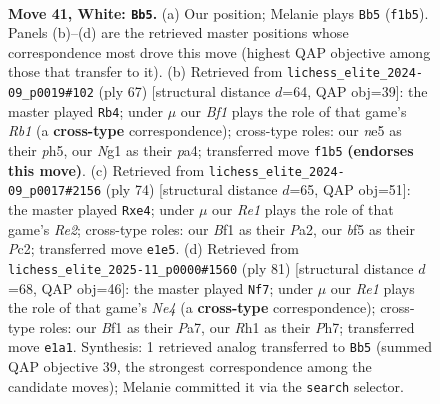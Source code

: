 \documentclass[11pt]{article}
\begin{document}
\clearpage

\begin{figure}[p]\centering
\begin{subfigure}{0.46\textwidth}\centering
\resizebox{\linewidth}{!}{%
\newchessgame
\chessboard[
  setfen={1r6/4r1k1/1p6/p1p1nb2/P5p1/1NP3P1/K6P/4RBNR w - - 3 41},
  showmover=false,
  pgfstyle=straightmove, color=movearrow, markmove={f1-b5}
]}
\caption{}
\end{subfigure}\hfill
\begin{subfigure}{0.46\textwidth}\centering
\resizebox{\linewidth}{!}{%
\newchessgame
\chessboard[
  setfen={1r5r/5kp1/4p3/p2pP2P/P1nP1P2/7R/8/R1B2K2 b - - 0 34},
  showmover=false,
  pgfstyle=straightmove, color=movearrow, markmove={b8-b4}
]}
\caption{}
\end{subfigure}
\\[4pt]
\begin{subfigure}{0.46\textwidth}\centering
\resizebox{\linewidth}{!}{%
\newchessgame
\chessboard[
  setfen={4r3/p1k3p1/1pp2b2/7p/nPN1pP1P/6P1/P1P1RNK1/8 w - - 1 38},
  showmover=false,
  pgfstyle=straightmove, color=movearrow, markmove={e2-e4}
]}
\caption{}
\end{subfigure}\hfill
\begin{subfigure}{0.46\textwidth}\centering
\resizebox{\linewidth}{!}{%
\newchessgame
\chessboard[
  setfen={4k3/p1r3pp/2PR1p2/K3n3/1N5P/1P4P1/P3r3/2R5 b - - 0 41},
  showmover=false,
  pgfstyle=straightmove, color=movearrow, markmove={e5-f7}
]}
\caption{}
\end{subfigure}
\caption{\textbf{Move 41, White: \texttt{Bb5}.} (a) Our position; Melanie plays \texttt{Bb5} (\texttt{f1b5}). Panels (b)--(d) are the retrieved master positions whose correspondence most drove this move (highest QAP objective among those that transfer to it). (b) Retrieved from \texttt{lichess\_elite\_2024-09\_p0019\#102} (ply 67) [structural distance $d$=64, QAP obj=39]: the master played \texttt{Rb4}; under $\mu$ our \emph{Bf1} plays the role of that game's \emph{Rb1} (a \textbf{cross-type} correspondence); cross-type roles: our \emph{n}e5 as their \emph{p}h5, our \emph{N}g1 as their \emph{p}a4; transferred move \texttt{f1b5} \textbf{(endorses this move)}. (c) Retrieved from \texttt{lichess\_elite\_2024-09\_p0017\#2156} (ply 74) [structural distance $d$=65, QAP obj=51]: the master played \texttt{Rxe4}; under $\mu$ our \emph{Re1} plays the role of that game's \emph{Re2}; cross-type roles: our \emph{B}f1 as their \emph{P}a2, our \emph{b}f5 as their \emph{P}c2; transferred move \texttt{e1e5}. (d) Retrieved from \texttt{lichess\_elite\_2025-11\_p0000\#1560} (ply 81) [structural distance $d$=68, QAP obj=46]: the master played \texttt{Nf7}; under $\mu$ our \emph{Re1} plays the role of that game's \emph{Ne4} (a \textbf{cross-type} correspondence); cross-type roles: our \emph{B}f1 as their \emph{P}a7, our \emph{R}h1 as their \emph{P}h7; transferred move \texttt{e1a1}. Synthesis: 1 retrieved analog transferred to \texttt{Bb5} (summed QAP objective 39, the strongest correspondence among the candidate moves); Melanie committed it via the \texttt{search} selector.}
\label{fig:thought-m80}
\end{figure}
\end{document}
